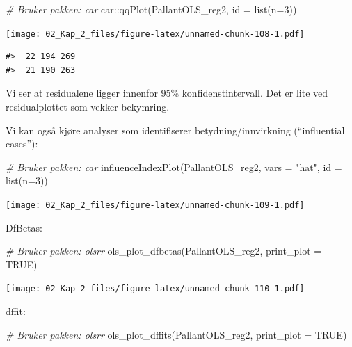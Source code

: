 \documentclass[
]{article}
\newenvironment{Shaded}{\begin{snugshade}}{\end{snugshade}}
\newcommand{\AttributeTok}[1]{\textcolor[rgb]{0.77,0.63,0.00}{#1}}
\newcommand{\CommentTok}[1]{\textcolor[rgb]{0.56,0.35,0.01}{\textit{#1}}}
\newcommand{\ConstantTok}[1]{\textcolor[rgb]{0.00,0.00,0.00}{#1}}
\newcommand{\DecValTok}[1]{\textcolor[rgb]{0.00,0.00,0.81}{#1}}
\newcommand{\FunctionTok}[1]{\textcolor[rgb]{0.00,0.00,0.00}{#1}}
\newcommand{\NormalTok}[1]{#1}
\newcommand{\SpecialCharTok}[1]{\textcolor[rgb]{0.00,0.00,0.00}{#1}}
\newcommand{\StringTok}[1]{\textcolor[rgb]{0.31,0.60,0.02}{#1}}
\begin{document}
\begin{Shaded}
\begin{Highlighting}[]
\CommentTok{\# Bruker pakken: car}
\NormalTok{car}\SpecialCharTok{::}\FunctionTok{qqPlot}\NormalTok{(PallantOLS\_reg2, }\AttributeTok{id =} \FunctionTok{list}\NormalTok{(}\AttributeTok{n=}\DecValTok{3}\NormalTok{))}
\end{Highlighting}
\end{Shaded}

\texttt{[image: 02\_Kap\_2\_files/figure-latex/unnamed-chunk-108-1.pdf]}

\begin{verbatim}
#>  22 194 269 
#>  21 190 263
\end{verbatim}

Vi ser at residualene ligger innenfor 95\% konfidenstintervall. Det er lite ved residualplottet som vekker bekymring.

Vi kan også kjøre analyser som identifiserer betydning/innvirkning (``influential cases''):

\begin{Shaded}
\begin{Highlighting}[]
\CommentTok{\# Bruker pakken: car}
\FunctionTok{influenceIndexPlot}\NormalTok{(PallantOLS\_reg2, }\AttributeTok{vars =} \StringTok{"hat"}\NormalTok{, }\AttributeTok{id =} \FunctionTok{list}\NormalTok{(}\AttributeTok{n=}\DecValTok{3}\NormalTok{))}
\end{Highlighting}
\end{Shaded}

\texttt{[image: 02\_Kap\_2\_files/figure-latex/unnamed-chunk-109-1.pdf]}

DfBetas:

\begin{Shaded}
\begin{Highlighting}[]
\CommentTok{\# Bruker pakken: olsrr}
\FunctionTok{ols\_plot\_dfbetas}\NormalTok{(PallantOLS\_reg2, }\AttributeTok{print\_plot =} \ConstantTok{TRUE}\NormalTok{)}
\end{Highlighting}
\end{Shaded}

\texttt{[image: 02\_Kap\_2\_files/figure-latex/unnamed-chunk-110-1.pdf]}

dffit:

\begin{Shaded}
\begin{Highlighting}[]
\CommentTok{\# Bruker pakken: olsrr}
\FunctionTok{ols\_plot\_dffits}\NormalTok{(PallantOLS\_reg2, }\AttributeTok{print\_plot =} \ConstantTok{TRUE}\NormalTok{)}
\end{Highlighting}
\end{Shaded}
\end{document}
